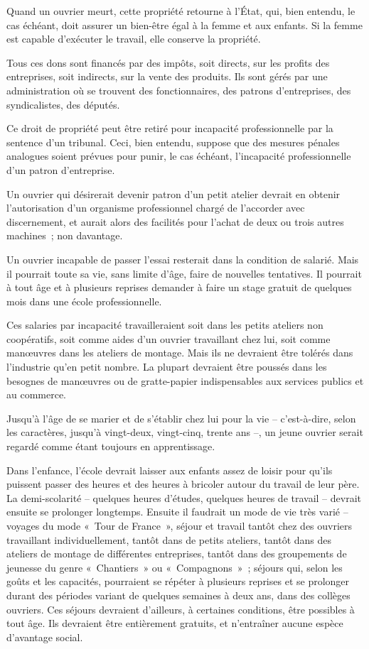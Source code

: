 \documentclass[french,twoside]{book} %
\begin{document}
Quand un ouvrier meurt, cette propriété retourne à l'État, qui, bien entendu, le cas échéant, doit assurer un bien-être égal à la femme et aux enfants. Si la femme est capable d'exécuter le travail, elle conserve la propriété.\par
Tous ces dons sont financés par des impôts, soit directs, sur les profits des entreprises, soit indirects, sur la vente des produits. Ils sont gérés par une administration où se trouvent des fonctionnaires, des patrons d'entreprises, des syndicalistes, des députés.\par
Ce droit de propriété peut être retiré pour incapacité professionnelle par la sentence d'un tribunal. Ceci, bien entendu, suppose que des mesures pénales analogues soient prévues pour punir, le cas échéant, l'incapacité professionnelle d'un patron d'entreprise.\par
Un ouvrier qui désirerait devenir patron d'un petit atelier devrait en obtenir l'autorisation d'un organisme professionnel chargé de l'accorder avec discernement, et aurait alors des facilités pour l'achat de deux ou trois autres machines ; non davantage.\par
Un ouvrier incapable de passer l'essai resterait dans la condition de salarié. Mais il pourrait toute sa vie, sans limite d'âge, faire de nouvelles tentatives. Il pourrait à tout âge et à plusieurs reprises demander à faire un stage gratuit de quelques mois dans une école professionnelle.\par
Ces salaries par incapacité travailleraient soit dans les petits ateliers non coopératifs, soit comme aides d'un ouvrier travaillant chez lui, soit comme manœuvres dans les ateliers de montage. Mais ils ne devraient être tolérés dans l'industrie qu'en petit nombre. La plupart devraient être poussés dans les besognes de manœuvres ou de gratte-papier indispensables aux services publics et au commerce.\par
Jusqu'à l'âge de se marier et de s'établir chez lui pour la vie – c'est-à-dire, selon les caractères, jusqu'à vingt-deux, vingt-cinq, trente ans –, un jeune ouvrier serait regardé comme étant toujours en apprentissage.\par
Dans l'enfance, l'école devrait laisser aux enfants assez de loisir pour qu'ils puissent passer des heures et des heures à bricoler autour du travail de leur père. La demi-scolarité – quelques heures d'études, quelques heures de travail – devrait ensuite se prolonger longtemps. Ensuite il faudrait un mode de vie très varié – voyages du mode « Tour de France », séjour et travail tantôt chez des ouvriers travaillant individuellement, tantôt dans de petits ateliers, tantôt dans des ateliers de montage de différentes entreprises, tantôt dans des groupements de jeunesse du genre « Chantiers » ou « Compagnons » ; séjours qui, selon les goûts et les capacités, pourraient se répéter à plusieurs reprises et se prolonger durant des périodes variant de quelques semaines à deux ans, dans des collèges ouvriers. Ces séjours devraient d'ailleurs, à certaines conditions, être possibles à tout âge. Ils devraient être entièrement gratuits, et n'entraîner aucune espèce d'avantage social.\par
\end{document}
